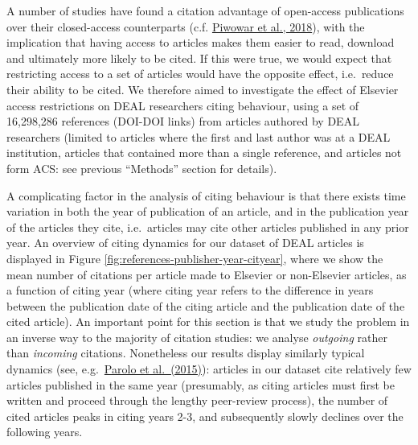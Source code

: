 \documentclass[
]{article}
\begin{document}
A number of studies have found a citation advantage of open-access publications over their closed-access counterparts (c.f. \href{https://doi.org/10.7717/peerj.4375}{Piwowar et al., 2018}), with the implication that having access to articles makes them easier to read, download and ultimately more likely to be cited. If this were true, we would expect that restricting access to a set of articles would have the opposite effect, i.e.~reduce their ability to be cited. We therefore aimed to investigate the effect of Elsevier access restrictions on DEAL researchers citing behaviour, using a set of 16,298,286 references (DOI-DOI links) from articles authored by DEAL researchers (limited to articles where the first and last author was at a DEAL institution, articles that contained more than a single reference, and articles not form ACS: see previous ``Methods'' section for details).

A complicating factor in the analysis of citing behaviour is that there exists time variation in both the year of publication of an article, and in the publication year of the articles they cite, i.e.~articles may cite other articles published in any prior year. An overview of citing dynamics for our dataset of DEAL articles is displayed in Figure \ref{fig:references-publisher-year-cityear}, where we show the mean number of citations per article made to Elsevier or non-Elsevier articles, as a function of citing year (where citing year refers to the difference in years between the publication date of the citing article and the publication date of the cited article). An important point for this section is that we study the problem in an inverse way to the majority of citation studies: we analyse \emph{outgoing} rather than \emph{incoming} citations. Nonetheless our results display similarly typical dynamics (see, e.g.~\href{https://doi.org/10.1016/j.joi.2015.07.006}{Parolo et al.~(2015)}): articles in our dataset cite relatively few articles published in the same year (presumably, as citing articles must first be written and proceed through the lengthy peer-review process), the number of cited articles peaks in citing years 2-3, and subsequently slowly declines over the following years.
\end{document}
